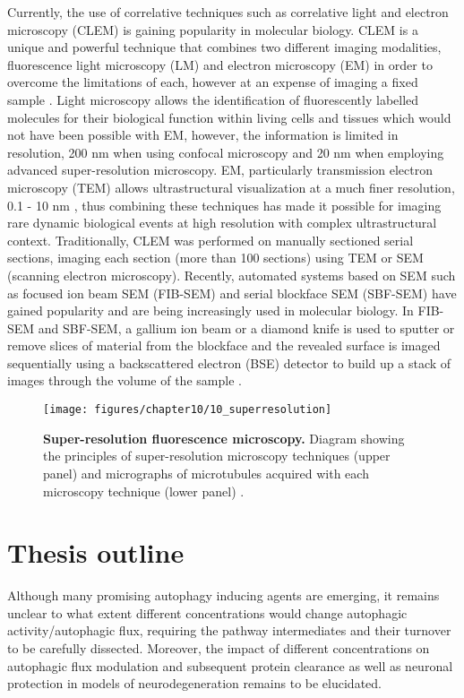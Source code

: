 Currently, the use of correlative techniques such as correlative light and electron microscopy (CLEM) is gaining popularity in molecular biology. CLEM is a unique and powerful technique that combines two different imaging modalities, fluorescence light microscopy (LM) and electron microscopy (EM) in order to overcome the limitations of each, however at an expense of imaging a fixed sample \citep{Russell2017}. Light microscopy allows the identification of fluorescently labelled molecules for their biological function within living cells and tissues which would not have been possible with EM, however, the information is limited in resolution, 200 nm when using confocal microscopy and 20 nm when employing advanced super-resolution microscopy.  EM, particularly transmission electron microscopy (TEM) allows ultrastructural visualization at a much finer resolution, 0.1 - 10 nm \citep{Feng2018}, thus combining these techniques has made it possible for imaging rare dynamic biological events at high resolution with complex ultrastructural context. Traditionally, CLEM was performed on manually sectioned serial sections, imaging each section (more than 100 sections) using TEM or SEM (scanning electron microscopy). Recently, automated systems  based on SEM such as focused ion beam SEM (FIB-SEM) \citep{Heymann2006} and serial blockface SEM (SBF-SEM) \citep{Denk2004} have gained popularity and are being increasingly used in molecular biology. In FIB-SEM and SBF-SEM, a gallium ion beam  or a diamond knife is used to sputter or remove slices of material from the blockface and the revealed surface is imaged sequentially using a backscattered electron (BSE) detector to build up a stack of images through the volume of the sample \citep{Russell2017}.

\begin{figure}[H]
  \texttt{[image: figures/chapter10/10\_superresolution]}
  \caption[Super-resolution fluorescence microscopy.]{\textbf{Super-resolution fluorescence microscopy.} Diagram showing the principles of super-resolution microscopy techniques (upper panel) and micrographs of microtubules acquired with each microscopy technique (lower panel) \citep{Feng2018}.}
  \label{fig:10_superresolution}
\end{figure}

\section{Thesis outline}
Although many promising autophagy inducing agents are emerging, it remains unclear to what extent different concentrations would change autophagic activity/autophagic flux, requiring the pathway intermediates and their turnover to be carefully dissected. Moreover, the impact of different concentrations on autophagic flux modulation and subsequent protein clearance as well as neuronal protection in models of neurodegeneration remains to be elucidated. 

